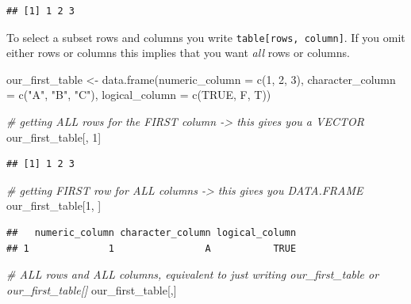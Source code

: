 \documentclass[
]{book}
\newenvironment{Shaded}{\begin{snugshade}}{\end{snugshade}}
\newcommand{\AttributeTok}[1]{\textcolor[rgb]{0.77,0.63,0.00}{#1}}
\newcommand{\CommentTok}[1]{\textcolor[rgb]{0.56,0.35,0.01}{\textit{#1}}}
\newcommand{\ConstantTok}[1]{\textcolor[rgb]{0.00,0.00,0.00}{#1}}
\newcommand{\DecValTok}[1]{\textcolor[rgb]{0.00,0.00,0.81}{#1}}
\newcommand{\FunctionTok}[1]{\textcolor[rgb]{0.00,0.00,0.00}{#1}}
\newcommand{\NormalTok}[1]{#1}
\newcommand{\OtherTok}[1]{\textcolor[rgb]{0.56,0.35,0.01}{#1}}
\newcommand{\StringTok}[1]{\textcolor[rgb]{0.31,0.60,0.02}{#1}}
\begin{document}
\begin{verbatim}
## [1] 1 2 3
\end{verbatim}

To select a subset rows and columns you write \texttt{table{[}rows,\ column{]}}. If you omit either rows or columns this implies that you want \emph{all} rows or columns.

\begin{Shaded}
\begin{Highlighting}[]
\NormalTok{our\_first\_table }\OtherTok{\textless{}{-}} \FunctionTok{data.frame}\NormalTok{(}\AttributeTok{numeric\_column =} \FunctionTok{c}\NormalTok{(}\DecValTok{1}\NormalTok{, }\DecValTok{2}\NormalTok{, }\DecValTok{3}\NormalTok{), }
                              \AttributeTok{character\_column =} \FunctionTok{c}\NormalTok{(}\StringTok{"A"}\NormalTok{, }\StringTok{"B"}\NormalTok{, }\StringTok{"C"}\NormalTok{),}
                              \AttributeTok{logical\_column =} \FunctionTok{c}\NormalTok{(}\ConstantTok{TRUE}\NormalTok{, F, T))}

\CommentTok{\# getting ALL rows for the FIRST column {-}\textgreater{} this gives you a VECTOR}
\NormalTok{our\_first\_table[, }\DecValTok{1}\NormalTok{]}
\end{Highlighting}
\end{Shaded}

\begin{verbatim}
## [1] 1 2 3
\end{verbatim}

\begin{Shaded}
\begin{Highlighting}[]
\CommentTok{\# getting FIRST row for ALL columns {-}\textgreater{} this gives you DATA.FRAME}
\NormalTok{our\_first\_table[}\DecValTok{1}\NormalTok{, ]}
\end{Highlighting}
\end{Shaded}

\begin{verbatim}
##   numeric_column character_column logical_column
## 1              1                A           TRUE
\end{verbatim}

\begin{Shaded}
\begin{Highlighting}[]
\CommentTok{\# ALL rows and ALL columns, equivalent to just writing \textasciigrave{}our\_first\_table\textasciigrave{} or \textasciigrave{}our\_first\_table[]\textasciigrave{}}
\NormalTok{our\_first\_table[,]}
\end{Highlighting}
\end{Shaded}
\end{document}
